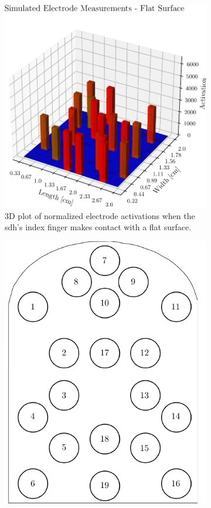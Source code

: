 \begin{figure}[!h]
	\centering
	\begin{subfigure}[b]{0.48\textwidth}
		\centering
		\includegraphics[width=\textwidth]{chapters/1-tactile-perception/fig/matplotlib/pressure-distribution.pdf}
		\caption{3D plot of normalized electrode activations when the \gls{sdh}'s index finger makes contact with a flat surface.}
		\label{fig:simulated-electrode-distribution}
	\end{subfigure}
	\hfill
	\begin{subfigure}[b]{0.48\textwidth}
		\centering
		\includegraphics[height=\textwidth]{chapters/1-tactile-perception/fig/drawio/electrode-map.pdf}

\end{subfigure}
\end{figure}
